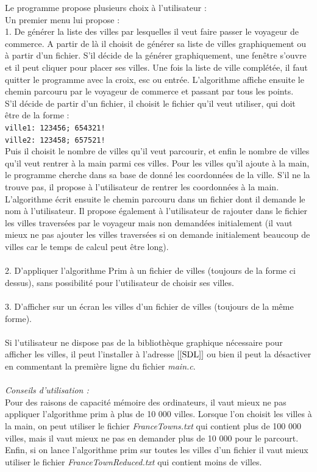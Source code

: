 \documentclass[a4paper,11pt]{article}
\begin{document}
Le programme propose plusieurs choix à l'utilisateur :\\
Un premier menu lui propose :\\
1. De générer la liste des villes par lesquelles il veut faire passer le voyageur de commerce.
A partir de là il choisit de générer sa liste de villes graphiquement ou à partir d'un fichier. S'il décide de la générer graphiquement, une fenêtre s'ouvre et il peut cliquer pour placer ses villes. Une fois la liste de ville complétée, il faut quitter le programme avec la croix, esc ou entrée. L'algorithme affiche ensuite le chemin parcouru par le voyageur de commerce et passant par tous les points.\\
S'il décide de partir d'un fichier, il choisit le fichier qu'il veut utiliser, qui doit être de la forme : \\
\texttt{ville1: 123456; 654321!}\\
\texttt{ville2: 123458; 657521!}\\
Puis il choisit le nombre de villes qu'il veut parcourir, et enfin le nombre de villes qu'il veut rentrer à la main parmi ces villes. Pour les villes qu'il ajoute à la main, le programme cherche dans sa base de donné les coordonnées de la ville. S'il ne la trouve pas, il propose à l'utilisateur de rentrer les coordonnées à la main. L'algorithme écrit ensuite le chemin parcouru dans un fichier dont il demande le nom à l'utilisateur. Il propose également à l'utilisateur de rajouter dans le fichier les villes traversées par le voyageur mais non demandées initialement (il vaut mieux ne pas ajouter les villes traversées si on demande initialement beaucoup de villes car le temps de calcul peut être long).\\
\\
2. D'appliquer l'algorithme Prim à un fichier de villes (toujours de la forme ci dessus), sans possibilité pour l'utilisateur de choisir ses villes.\\
\\
3. D'afficher sur un écran les villes d'un fichier de villes (toujours de la même forme).\\
\\
Si l'utilisateur ne dispose pas de la bibliothèque graphique nécessaire pour afficher les villes, il peut l'installer à l'adresse $\left[\ref{SDL}\right]$ ou bien il peut la désactiver en commentant la première ligne du fichier \textit{main.c}.\\
\\
\textit{Conseils d'utilisation : }\\
Pour des raisons de capacité mémoire des ordinateurs, il vaut mieux ne pas appliquer l'algorithme prim à plus de 10 000 villes.
Lorsque l'on choisit les villes à la main, on peut utiliser le fichier \textit{FranceTowns.txt} qui contient plus de 100 000 villes, mais il vaut mieux ne pas en demander plus de 10 000 pour le parcourt.
Enfin, si on lance l'algorithme prim sur toutes les villes d'un fichier il vaut mieux utiliser le fichier \textit{FranceTownReduced.txt} qui contient moins de villes.
\end{document}
